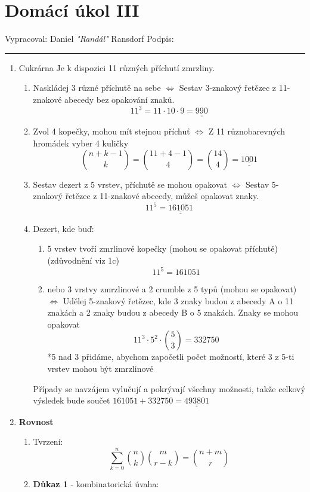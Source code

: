 \documentclass[12pt]{article}
\begin{document}
\section*{Domácí úkol III}

Vypracoval: Daniel \textit{"Randál"} Ransdorf \hfill Podpis: \rule{4cm}{0.4pt}

\begin{enumerate}
  \item {Cukrárna}
    Je k dispozici 11 různých příchutí zmrzliny.

    \begin{enumerate}
      \item Naskládej 3 různé příchutě na sebe $\Longleftrightarrow$ Sestav 3-znakový řetězec z 11-znakové abecedy bez opakování znaků.
          \[
            11^{\underline{3}} = 11 \cdot 10 \cdot 9 = \underline{\underline{990}}
          \]
      \item Zvol 4 kopečky, mohou mít stejnou příchuť $\Longleftrightarrow$ Z 11 různobarevných hromádek vyber 4 kuličky
          \[
            \binom{n+k-1}{k} = \binom{11+4-1}{4} = \binom{14}{4} = \underline{\underline{1001}}
          \]
      \item Sestav dezert z 5 vrstev, příchutě se mohou opakovat $\Longleftrightarrow$ Sestav 5-znakový řetězec z 11-znakové abecedy, můžeš opakovat znaky.
          \[
            11^5 = \underline{\underline{161051}}
          \]
      \item Dezert, kde buď:
        \begin{enumerate}
            \item 5 vrstev tvoří zmrlinové kopečky (mohou se opakovat příchutě) (zdůvodnění viz 1c)
              \[11^5 = 161051\]
            \item nebo 3 vrstvy zmrzlinové a 2 crumble z 5 typů (mohou se opakovat) $\Longleftrightarrow$ Udělej 5-znakový řetězec, kde 3 znaky budou z abecedy A o 11 znakách a 2 znaky budou z abecedy B o 5 znakách. Znaky se mohou opakovat
              \[
                11^3 \cdot 5^2 \cdot \binom{5}{3} = 332750
                \]
                *5 nad 3 přidáme, abychom započetli počet možností, které 3 z 5-ti vrstev mohou být zmrzlinové
        \end{enumerate}
        Případy se navzájem vylučují a pokrývají všechny možnosti, takže celkový výsledek bude součet $161051+332750=\underline{\underline{493801}}$
    \end{enumerate}

  \item \textbf{Rovnost}
    \begin{enumerate}
      \item Tvrzení:
        \[
          \sum_{k=0}^{n} \binom{n}{k}\binom{m}{r-k} = \binom{n+m}{r}
        \]
      \item \textbf{Důkaz 1} - kombinatorická úvaha:


\end{enumerate}
\end{enumerate}
\end{document}
